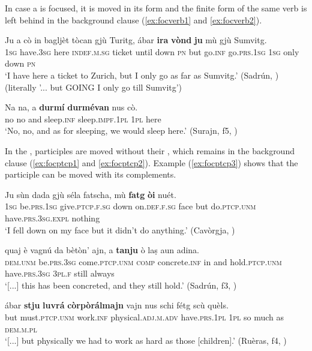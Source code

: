 In case a  is focused, it is moved in its  form and the finite form of the same verb is left behind in the background clause (\ref{ex:focverb1} and \ref{ex:focverb2}).


\ea
\label{ex:focverb1}
\gll  Ju a cò in bagljèt tòcan gjù Turitg, ábar \textbf{ira} \textbf{vònd} \textbf{ju} mù gjù Sumvitg.\\
\textsc{1sg} have.\textsc{3sg} here \textsc{indef.m.sg} ticket until down \textsc{pn} but go.\textsc{inf} go.\textsc{prs}.\textsc{1sg} \textsc{1sg} only down \textsc{pn}\\
\glt `I have here a ticket to Zurich, but I only go as far as Sumvitg.' (Sadrún, \citealt[106]{Büchli1966}) (literally '... but GOING I only go till Sumvitg')
\z

\ea
\label{ex:focverb2}
\gll Na na, a \textbf{durmí} \textbf{durmévan} nus cò.\\
no no and sleep.\textsc{inf} sleep.\textsc{impf.1pl} \textsc{1pl} here \\
\glt `No, no, and as for sleeping, we would sleep here.' (Surajn, f5, )
\z

In the , participles are moved without their , which remains in the background clause (\ref{ex:focptcp1} and \ref{ex:focptcp2}). Example (\ref{ex:focptcp3}) shows that the participle can be moved with its complements.

\ea
\label{ex:focptcp1}
\gll Ju sùn dada gjù séla fatscha, mù \textbf{fatg} \textbf{òi} nuét.\\
\textsc{1sg} be.\textsc{prs.1sg} give.\textsc{ptcp.f.sg} down on.\textsc{def.f.sg} face but do.\textsc{ptcp.unm} have.\textsc{prs.3sg.expl} nothing\\
\glt `I fell down on my face but it didn't do anything.' (Cavòrgja, \citealt[106]{Büchli1966})
\z

\ea
\label{ex:focptcp2}
\gll  [...] quaj è vagnú da bètòn’ ajn, a \textbf{tanju} ò laṣ aun adina. \\
{} \textsc{dem.unm} be.\textsc{prs.3sg} come.\textsc{ptcp.unm} \textsc{comp} concrete.\textsc{inf} in and hold.\textsc{ptcp.unm} have.\textsc{prs.3sg} \textsc{3pl.f} still always \\
\glt `[...] this has been concreted, and they still hold.' (Sadrún, f3, )
\z

\ea
\label{ex:focptcp3}
\gll [...] ábar \textbf{stju} \textbf{luvrá} \textbf{còrpòrálmajn} vajn nus schi fétg scù quèls.\\
{}	but must.\textsc{ptcp.unm} work.\textsc{inf} physical.\textsc{adj.m.adv} have.\textsc{prs.1pl} \textsc{1pl} so much as \textsc{dem.m.pl}\\
\glt `[...] but physically we had to work as hard as those [children].' (Ruèras, f4, )
\z

